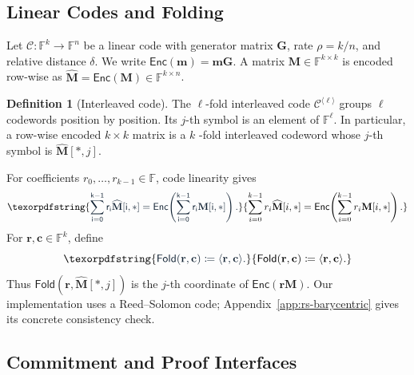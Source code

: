 \documentclass[conference,compsoc]{IEEEtran}
\newcommand{\mat}{\mathbf}          %
\newcommand{\vect}{\mathbf}         %
\renewcommand{\enc}{\mathsf{Enc}}   %
\newcommand{\fold}{\textsf{Fold}}
\theoremstyle{plain}
\theoremstyle{definition}
\newtheorem{definition}[theorem]{Definition}
\theoremstyle{remark}
\providecommand{\DIFaddtex}[1]{{\protect\color{DIFADD} \sf #1}} %
\providecommand{\DIFaddbegin}{} %
\providecommand{\DIFaddend}{} %
\providecommand{\DIFadd}[1]{\texorpdfstring{\DIFaddtex{#1}}{#1}} %
\providecommand{\DIFaddincludegraphics}[2][]{{\color{blue}\fbox{\DIFOincludegraphics[#1]{#2}}}} %
\DeclareRobustCommand{\DIFaddbegin}{\DIFOaddbegin \let\includegraphics\DIFaddincludegraphics} %
\DeclareRobustCommand{\DIFaddend}{\DIFOaddend \let\includegraphics\DIFOincludegraphics} %
\begin{document}
\subsection{Linear  Codes \DIFaddbegin \DIFadd{and Folding}\DIFaddend }
\label{sec:prelim-codes}

 \DIFaddbegin \DIFadd{Let \(\mathcal{C}:\mathbb{F}^k\to\mathbb{F}^n\) be a linear code with
generator matrix \(\mat{G}\), rate \(\rho=k/n\), }\DIFaddend and  \DIFaddbegin \DIFadd{relative distance
\(\delta\).  We write \(\enc(\vect{m})=\vect{m}\mat{G}\).  A matrix
\(\mat{M}\in\mathbb{F}^{k\times k}\) is encoded row-wise as
\(\widehat{\mat{M}}=\enc(\mat{M})\in\mathbb{F}^{k\times n}\).
}\DIFaddend 

\begin{definition}[Interleaved code]\label{def:interleaved-code}
 \DIFaddbegin \DIFadd{The }\DIFaddend \(\ell\)-fold interleaved code  \DIFaddbegin \DIFadd{\(\mathcal{C}^{\langle\ell\rangle}\)
groups }\DIFaddend \(\ell\) codewords  position by position.   \DIFaddbegin \DIFadd{Its }\DIFaddend \(j\)-th symbol is  \DIFaddbegin \DIFadd{an
element of \(\mathbb{F}^{\ell}\).  In particular, a }\DIFaddend row-wise  \DIFaddbegin \DIFadd{encoded
\(k\times k\) matrix is a }\DIFaddend \(k\) \DIFaddbegin \DIFadd{-fold interleaved codeword whose }\DIFaddend \(j\)-th
 \DIFaddbegin \DIFadd{symbol is \(\widehat{\mat{M}}[*,j]\)}\DIFaddend .
\end{definition}

 \DIFaddbegin \DIFadd{For coefficients \(r_0,\ldots,r_{k-1}\in\mathbb{F}\), code linearity gives
}\begin{equation}\DIFadd{\label{eq:code-linearity}
  \sum_{i=0}^{k-1}r_i\widehat{\mat{M}}[i,*]
  =\enc\!\left(\sum_{i=0}^{k-1}r_i\mat{M}[i,*]\right).
}\end{equation}\DIFaddend 
 \DIFaddbegin \DIFadd{For \(\vect{r},\vect{c}\in\mathbb{F}^k\), define
}\begin{equation}\DIFadd{\label{def:fold}
  \fold(\vect{r},\vect{c})\coloneqq
  \langle\vect{r},\vect{c}\rangle.
}\end{equation}\DIFaddend 
 \DIFaddbegin \DIFadd{Thus \(\fold(\vect{r},\widehat{\mat{M}}[*,j])\) is the \(j\)}\DIFaddend -th  \DIFaddbegin \DIFadd{coordinate
of \(\enc(\vect{r}\mat{M})\).  Our implementation uses a Reed--Solomon code;
Appendix~\ref{app:rs-barycentric} gives its concrete consistency check}\DIFaddend .

\subsection{Commitment  \DIFaddbegin \DIFadd{and Proof Interfaces}\DIFaddend }
\label{sec:prelim-commitments}
 \DIFaddbegin 
\end{document}
